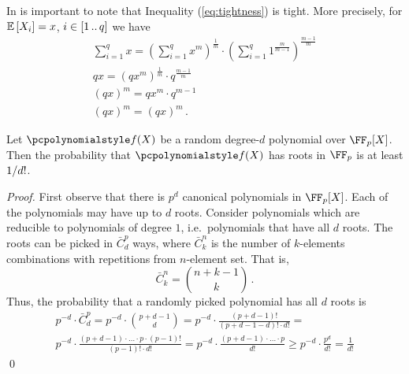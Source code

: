 \begin{remark}
	In is important to note that Inequality (\ref{eq:tightness}) is tight. More
  precisely, for $\mathbb{E}\left[X_i\right] = x$, $i \in [1 \, .. \, q]$ we have
	\begin{gather*}
		\sum_{i = 1}^q x = \left(\sum_{i = 1}^{q} x^m\right)^\frac{1}{m} \cdot \left(\sum_{i = 1}^{q} 1^{\frac{m}{m - 1}}\right)^{\frac{m - 1}{m}} \\
		qx = \left(qx^m\right)^\frac{1}{m} \cdot q^{\frac{m - 1}{m}} \\
		(qx)^m = qx^m \cdot q^{m - 1} \\
		(qx)^m = (qx)^m\,.
	\end{gather*}
\end{remark}

\begin{lemma}
  \label{lem:root_prob}
  Let $\p{f}(X)$ be a random degree-$d$ polynomial over $\FF_p[X]$. Then the
  probability that $\p{f}(X)$ has roots in $\FF_p$ is at least $1 / d!$.
\end{lemma}
\begin{proof}
  First observe that there is $p^{d}$ canonical polynomials in $\FF_p[X]$.  Each
  of the polynomials may have up to $d$ roots. Consider polynomials which are
  reducible to polynomials of degree $1$, i.e.~polynomials that have all $d$
  roots. The roots can be picked in $\bar{C}^{p}_{d}$ ways, where
  $\bar{C}^{n}_{k}$ is the number of $k$-elements combinations with repetitions
  from $n$-element set. That is,
  \[
    \bar{C}^n_k = \binom{n + k - 1}{k}\,.
  \]
  Thus, the probability that a randomly picked polynomial has all $d$ roots is
  \begin{multline*}
    p^{-d} \cdot \bar{C}^p_d = p^{-d} \cdot \binom{p + d - 1}{d} =
    p^{-d} \cdot \frac{(p + d - 1)!}{(p + d - 1 - d)! \cdot d!} = \\
    p^{-d} \cdot \frac{(p + d - 1) \cdot \ldots \cdot p \cdot (p - 1)!}{(p - 1)!
      \cdot d!} = p^{-d} \cdot \frac{(p + d - 1)\cdot
      \ldots \cdot p}{d!}
    \geq p^{-d} \cdot {\frac{p^d}{d!}} = \frac{1}{d!}
  \end{multline*}
  \qed
\end{proof}


